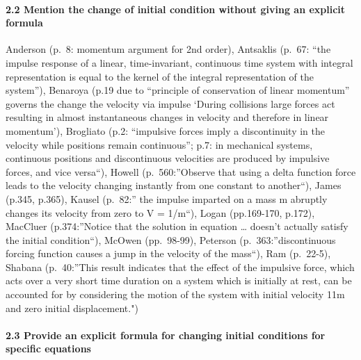 \documentclass[
  11pt,
]{article}
\begin{document}
\hypertarget{mention-the-change-of-initial-condition-without-giving-an-explicit-formula}{%
\paragraph{2.2 Mention the change of initial condition without giving an
explicit
formula}\label{mention-the-change-of-initial-condition-without-giving-an-explicit-formula}}

Anderson (p.~8: momentum argument for 2nd order), Antsaklis (p.~67:
``the impulse response of a linear, time-invariant, continuous time
system with integral representation is equal to the kernel of the
integral representation of the system''), Benaroya (p.19 due to
``principle of conservation of linear momentum'' governs the change the
velocity via impulse `During collisions large forces act resulting in
almost instantaneous changes in velocity and therefore in linear
momentum'), Brogliato (p.2: ``impulsive forces imply a discontinuity in
the velocity while positions remain continuous''; p.7: in mechanical
systems, continuous positions and discontinuous velocities are produced
by impulsive forces, and vice versa``), Howell (p.~560:''Observe that
using a delta function force leads to the velocity changing instantly
from one constant to another``), James (p.345, p.365), Kausel (p.~82:''
the impulse imparted on a mass m abruptly changes its velocity from zero
to V = 1/m``), Logan (pp.169-170, p.172), MacCluer (p.374:''Notice that
the solution in equation \ldots{} doesn't actually satisfy the initial
condition``), McOwen (pp.~98-99), Peterson (p.~363:''discontinuous
forcing function causes a jump in the velocity of the mass``), Ram
(p.~22-5), Shabana (p.~40:''This result indicates that the effect of the
impulsive force, which acts over a very short time duration on a system
which is initially at rest, can be accounted for by considering the
motion of the system with initial velocity 11m and zero initial
displacement.")

\hypertarget{provide-an-explicit-formula-for-changing-initial-conditions-for-specific-equations}{%
\paragraph{2.3 Provide an explicit formula for changing initial
conditions for specific
equations}\label{provide-an-explicit-formula-for-changing-initial-conditions-for-specific-equations}}
\end{document}
